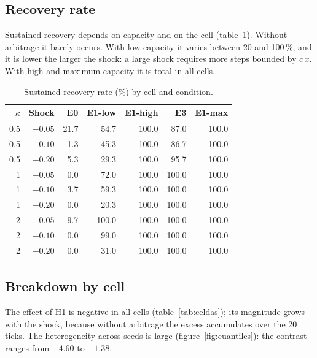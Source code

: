 \subsection{Recovery rate}

Sustained recovery depends on capacity and on the cell (table~\ref{tab:recuperacion}). Without arbitrage it barely occurs. With low capacity it varies between 20 and 100\,\%, and it is lower the larger the shock: a large shock requires more steps bounded by $c\,x$. With high and maximum capacity it is total in all cells.

\begin{table}[htbp]
\centering
\caption{Sustained recovery rate (\%) by cell and condition.}
\label{tab:recuperacion}
\small
\begin{tabular}{@{}rrrrrrr@{}}
\toprule
$\kappa$ & Shock & E0 & E1-low & E1-high & E3 & E1-max \\
\midrule
0.5 & $-0.05$ & 21.7 & 54.7 & 100.0 & 87.0 & 100.0 \\
0.5 & $-0.10$ & 1.3 & 45.3 & 100.0 & 86.7 & 100.0 \\
0.5 & $-0.20$ & 5.3 & 29.3 & 100.0 & 95.7 & 100.0 \\
1 & $-0.05$ & 0.0 & 72.0 & 100.0 & 100.0 & 100.0 \\
1 & $-0.10$ & 3.7 & 59.3 & 100.0 & 100.0 & 100.0 \\
1 & $-0.20$ & 0.0 & 20.3 & 100.0 & 100.0 & 100.0 \\
2 & $-0.05$ & 9.7 & 100.0 & 100.0 & 100.0 & 100.0 \\
2 & $-0.10$ & 0.0 & 99.0 & 100.0 & 100.0 & 100.0 \\
2 & $-0.20$ & 0.0 & 31.0 & 100.0 & 100.0 & 100.0 \\
\bottomrule
\end{tabular}
\end{table}

\subsection{Breakdown by cell}

The effect of H1 is negative in all cells (table~\ref{tab:celdas}); its magnitude grows with the shock, because without arbitrage the excess accumulates over the 20 ticks. The heterogeneity across seeds is large (figure~\ref{fig:cuantiles}): the contrast ranges from $-4.60$ to $-1.38$.

